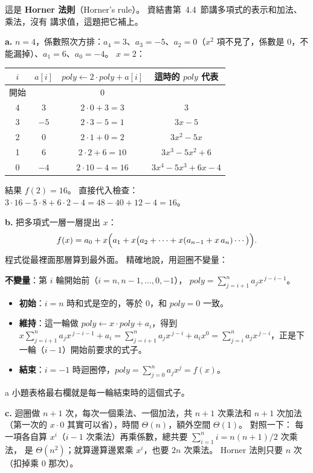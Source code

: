 \begin{pastsoln}
這是 \textbf{Horner 法則}（Horner's rule）。 資結書第~4.4~節講多項式的表示和加法、乘法，沒有
講求值，這題把它補上。

\textbf{a.} $n = 4$，係數照次方排：$a_4 = 3$、$a_3 = -5$、$a_2 = 0$（$x^2$ 項不見了，係數是
$0$，不能漏掉）、$a_1 = 6$、$a_0 = -4$。 $x = 2$：
\begin{center}
\begin{tabular}{cccc}
\toprule
$i$ & $a[i]$ & $\mathit{poly} \gets 2 \cdot \mathit{poly} + a[i]$ & 這時的 $\mathit{poly}$ 代表 \\
\midrule
開始 & & $0$ & \\
4 & $3$ & $2 \cdot 0 + 3 = 3$ & $3$ \\
3 & $-5$ & $2 \cdot 3 - 5 = 1$ & $3x - 5$ \\
2 & $0$ & $2 \cdot 1 + 0 = 2$ & $3x^2 - 5x$ \\
1 & $6$ & $2 \cdot 2 + 6 = 10$ & $3x^3 - 5x^2 + 6$ \\
0 & $-4$ & $2 \cdot 10 - 4 = 16$ & $3x^4 - 5x^3 + 6x - 4$ \\
\bottomrule
\end{tabular}
\end{center}
結果 $f(2) = 16$。 直接代入檢查：$3 \cdot 16 - 5 \cdot 8 + 6 \cdot 2 - 4 = 48 - 40 + 12 - 4 = 16$。

\textbf{b.} 把多項式一層一層提出 $x$：
\[
f(x) = a_0 + x\Bigl(a_1 + x\bigl(a_2 + \cdots + x(a_{n-1} + x\,a_n)\cdots\bigr)\Bigr).
\]
程式從最裡面那層算到最外面。 精確地說，用迴圈不變量：

\textbf{不變量}：第 $i$ 輪開始前（$i = n, n-1, \ldots, 0, -1$），
$\mathit{poly} = \sum_{j=i+1}^{n} a_j x^{\,j-i-1}$。

\begin{itemize}
\item \textbf{初始}：$i = n$ 時和式是空的，等於 $0$，和 $\mathit{poly} = 0$ 一致。
\item \textbf{維持}：這一輪做 $\mathit{poly} \gets x \cdot \mathit{poly} + a_i$，得到
$x\sum_{j=i+1}^{n} a_j x^{\,j-i-1} + a_i = \sum_{j=i+1}^{n} a_j x^{\,j-i} + a_i x^0
= \sum_{j=i}^{n} a_j x^{\,j-i}$，正是下一輪（$i - 1$）開始前要求的式子。
\item \textbf{結束}：$i = -1$ 時迴圈停，$\mathit{poly} = \sum_{j=0}^{n} a_j x^{j} = f(x)$。
\end{itemize}
a 小題表格最右欄就是每一輪結束時的這個式子。

\textbf{c.} 迴圈做 $n + 1$ 次，每次一個乘法、一個加法，共 $n + 1$ 次乘法和 $n + 1$ 次加法
（第一次的 $x \cdot 0$ 其實可以省），時間 $\Theta(n)$，額外空間 $\Theta(1)$。 對照一下：
每一項各自算 $x^i$（$i - 1$ 次乘法）再乘係數，總共要 $\sum_{i=1}^{n} i = n(n+1)/2$ 次乘法，
是 $\Theta(n^2)$；就算邊算邊累乘 $x^i$，也要 $2n$ 次乘法。 Horner 法則只要 $n$ 次（扣掉乘
$0$ 那次）。
\end{pastsoln}
